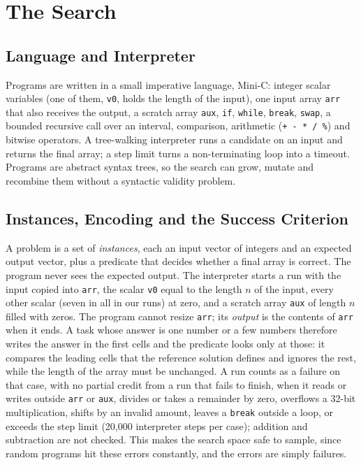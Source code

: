 \documentclass[sigconf,nonacm]{acmart}
\begin{document}
\section{The Search}
\label{sec:search}

\subsection{Language and Interpreter}
Programs are written in a small imperative language, Mini-C: integer scalar variables (one of them, \texttt{v0}, holds the length of
the input), one input array \texttt{arr} that also receives the output, a scratch array \texttt{aux}, \texttt{if}, \texttt{while},
\texttt{break}, \texttt{swap}, a bounded recursive call over an interval, comparison, arithmetic (\texttt{+ - * / \%}) and bitwise operators.
A tree-walking interpreter runs a candidate on an input and returns the final array; a step limit turns a non-terminating loop into a
timeout. Programs are abstract syntax trees, so the search can grow, mutate and recombine them without a syntactic validity problem.

\subsection{Instances, Encoding and the Success Criterion}
\label{sec:encoding}
A problem is a set of \emph{instances}, each an input vector of integers and an expected output vector, plus a predicate that decides whether a final array is correct.
The program never sees the expected output. The interpreter starts a run with the input copied into \texttt{arr}, the scalar \texttt{v0} equal to the length $n$ of the input, every other scalar
(seven in all in our runs) at zero, and a scratch array \texttt{aux} of length $n$ filled with zeros. The program cannot resize \texttt{arr}; its \emph{output} is the contents of \texttt{arr} when it ends. A task whose answer is one number or a few
numbers therefore writes the answer in the first cells and the predicate looks only at those: it compares the leading cells that the reference solution defines and ignores the rest, while the length of the array must be unchanged.
A run counts as a failure on that case, with no partial credit from a run that fails to finish, when it reads or writes outside \texttt{arr} or \texttt{aux}, divides or takes a remainder by zero, overflows a 32-bit multiplication,
shifts by an invalid amount, leaves a \texttt{break} outside a loop, or exceeds the step limit (20,000 interpreter steps per case); addition and subtraction are not checked.
This makes the search space safe to sample, since random programs hit these errors constantly, and the errors are simply failures.
\end{document}
